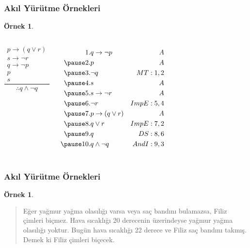 \documentclass[dvipsnames]{beamer}
\theoremstyle{definition}
\theoremstyle{example}
\newtheorem{ornek}[theorem]{Örnek}
\theoremstyle{plain}
\begin{document}
\begin{frame}
  \frametitle{Akıl Yürütme Örnekleri}

  \begin{ornek}
    \begin{columns}
      \[
      \frac
        {
          \begin{array}{c}
            p \rightarrow (q \vee r)\\
            s \rightarrow \neg r\\
            q \rightarrow \neg p\\
            p\\
            s
          \end{array}
        }
        {
          \therefore q \wedge \neg q
        }
      \]

      \pause
      \begin{eqnarray*}
        1. & q \rightarrow \neg p     & A\\
       \pause
        2. & p                        & A\\
       \pause
        3. & \neg q                   & MT:1,2\\
       \pause
        4. & s                        & A\\
       \pause
        5. & s \rightarrow \neg r     & A\\
       \pause
        6. & \neg r                   & ImpE:5,4\\
       \pause
        7. & p \rightarrow (q \vee r) & A\\
       \pause
        8. & q \vee r                 & ImpE:7,2\\
       \pause
        9. & q                        & DS:8,6\\
       \pause
       10. & q \wedge \neg q          & AndI:9,3
      \end{eqnarray*}
    \end{columns}
  \end{ornek}
\end{frame}

\begin{frame}
  \frametitle{Akıl Yürütme Örnekleri}

  \begin{ornek}
    \begin{quote}
      Eğer yağmur yağma olasılığı varsa veya saç bandını bulamazsa, Filiz
      çimleri biçmez. Hava sıcaklığı 20 derecenin üzerindeyse yağmur yağma
      olasılığı yoktur. Bugün hava sıcaklığı 22 derece ve Filiz saç bandını
      takmış. Demek ki Filiz çimleri biçecek.
    \end{quote}
  \end{ornek}
\end{frame}
\end{document}

